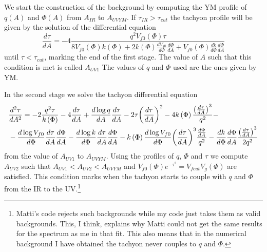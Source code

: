 \documentclass[a4paper,12pt]{article}
\begin{document}
We start the construction of the background by computing the YM profile of $q\left(A\right)$ and $\Phi\left(A\right)$ from $A_{IR}$ to $A_{UVYM}$. If $\tau_{IR} > \tau_{cut}$ the tachyon profile will be given by the solution of the differential equation
\begin{equation}
	\frac{d\tau}{dA} = - 4 \frac{q^2 V_{f0}\left(\Phi\right) \tau}{8 V_{f0}\left( \Phi\right) k\left(\Phi\right) + 2 k\left(\Phi\right) \frac{d V_{f0}}{d\Phi} \frac{d\Phi}{dA} + V_{f0} \left(\Phi\right) \frac{dk}{d\Phi} \frac{d\Phi}{dA} }
\end{equation}
until $\tau < \tau_{cut}$, marking the end of the first stage. The value of $A$ such that this condition is met is called $A_{UV1}$ The values of $q$ and $\Phi$ used are the ones given by YM.

In the second stage we solve the tachyon differential equation
\begin{align}
&\frac{d^2\tau}{d A^2} = - 2 \frac{q^2 \tau}{k\left(\Phi\right)} - 4 \frac{d \tau}{dA} + \frac{d \log q}{dA} \frac{d\tau}{dA} - 2 \tau {\left(\frac{d\tau}{dA}\right)}^2 - 4 k\left(\Phi\right) \frac{{\left( \frac{d\tau}{dA}\right)}^3}{q^2} - \\ \notag
& - \frac{d \log V_{f0}}{d\Phi} \frac{d\tau}{dA} \frac{d\Phi}{dA} - \frac{d \log k}{d\Phi} \frac{d\tau}{dA} \frac{d\Phi}{dA} - k\left(\Phi\right) \frac{d \log V_{f0}}{d\Phi} {\left(\frac{d\tau}{dA}\right)}^3 \frac{\frac{d\Phi}{dA}}{q^2} - \frac{d k}{d\Phi} \frac{d\Phi}{dA} \frac{{\left(\frac{d\tau}{dA}\right)}^3}{2 q^2}
\label{eq: tau YM 2}
\end{align}
from the value of $A_{UV1}$ to $A_{UVYM}$. Using the profiles of $q$, $\Phi$ and $\tau$ we compute $A_{UV2}$ such that $A_{UV1} < A_{UV2} < A_{UVYM}$ and $V_{f0}\left(\Phi\right) e^{-\tau^2} = V_{fcut} V_g \left(\Phi\right)$ are satisfied. This condition marks when the tachyon starts to couple with $q$ and $\Phi$ from the IR to the UV.\footnote{Matti's code rejects such backgrounds while my code just takes them as valid backgrounds. This, I think, explains why Matti could not get the same results for the spectrum as me in that fit. This also means that in the numerical background I have obtained the tachyon never couples to $q$ and $\Phi$. }
\end{document}
